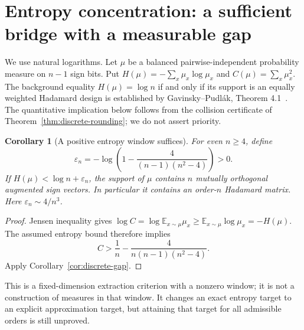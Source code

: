 \documentclass[11pt]{article}
\newtheorem{corollary}[theorem]{Corollary}
\begin{document}
\section{Entropy concentration: a sufficient bridge with a measurable gap}
\label{sec:entropy-bridge}
We use natural logarithms. Let $\mu$ be a balanced pairwise-independent
probability measure on $n-1$ sign bits. Put
$H(\mu)=-\sum_x\mu_x\log\mu_x$ and $C(\mu)=\sum_x\mu_x^2$.
The background equality $H(\mu)=\log n$ if and only if its support
is an equally weighted Hadamard design is established by
Gavinsky--Pudl\'ak, Theorem 4.1~\cite{GP}. The quantitative implication
below follows from the collision certificate of
Theorem~\ref{thm:discrete-rounding}; we do not assert priority.

\begin{corollary}[A positive entropy window suffices]\label{cor:entropy-window}
For even $n\ge4$, define
\[
 \varepsilon_n=-\log\left(1-\frac4{(n-1)(n^2-4)}\right)>0.
\]
If $H(\mu)<\log n+\varepsilon_n$, the support of $\mu$ contains
$n$ mutually orthogonal augmented sign vectors. In particular it
contains an order-$n$ Hadamard matrix. Here
$\varepsilon_n\sim4/n^3$.
\end{corollary}
\begin{proof}
Jensen inequality gives
$\log C=\log\mathbb E_{x\sim\mu}\mu_x
\ge\mathbb E_{x\sim\mu}\log\mu_x=-H(\mu)$.
The assumed entropy bound therefore implies
\[
 C>\frac1n-\frac4{n(n-1)(n^2-4)}.
\]
Apply Corollary~\ref{cor:discrete-gap}.
\end{proof}
This is a fixed-dimension extraction criterion with a nonzero window;
it is not a construction of measures in that window. It changes an
exact entropy target to an explicit approximation target, but attaining
that target for all admissible orders is still unproved.
\end{document}
